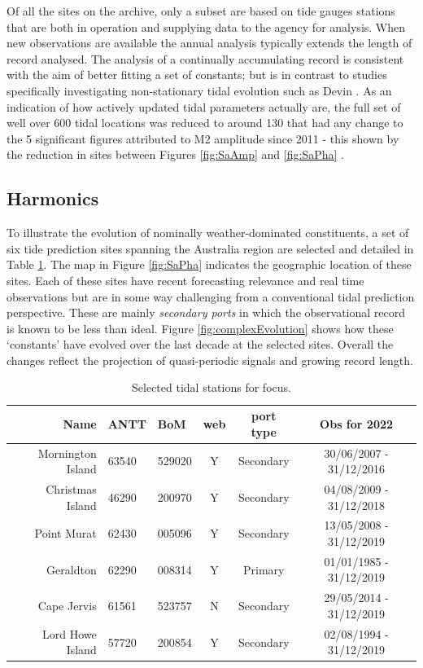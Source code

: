 Of all the sites on the archive, only a subset are based on tide gauges stations that are both in operation and supplying data to the agency for analysis. When new observations are available the annual analysis typically extends the length of record analysed.   The analysis of a continually accumulating record is consistent with the aim of better fitting a set of constants; but is in contrast to studies specifically investigating non-stationary tidal evolution such as Devin \citep{10.1002/2017jc013165}.
As an indication of how actively updated tidal parameters actually are, the full set of well over 600 tidal locations was reduced to around 130 that had any change to the 5 significant figures attributed to M2 amplitude since 2011 - this shown by the reduction in sites between Figures \ref{fig:SaAmp} and \ref{fig:SaPha} .


\subsection{Harmonics}
To illustrate the evolution of nominally weather-dominated constituents, a set of six tide prediction sites spanning the Australia region are selected and detailed in Table \ref{tab:sites}.  The map in Figure  \ref{fig:SaPha} indicates the geographic location of these sites.
Each of these sites have recent forecasting relevance and real time observations but are in some way challenging from a conventional tidal prediction perspective.   These are mainly \textit{secondary ports} in which the observational record is known to be less than ideal. 
Figure \ref{fig:complexEvolution} shows how these `constants' have evolved over the last decade at the selected sites.   Overall the changes reflect the projection of quasi-periodic signals and growing record length.  

% 
\begin{table}\centering
\begin{tabular}{ r|p{1cm}|p{1.2cm}|c|c|c }
Name 
 & ANTT 
 & BoM 
 & web  
 & port type
 & Obs for 2022
  \\ 
\hline
Mornington Island 
 & 63540 
 & 529020 
 & Y 
 & Secondary 
 & 30/06/2007 - 31/12/2016
 \\
Christmas Island  
 & 46290 
 & 200970 
 & Y 
 & Secondary 
 & 04/08/2009 - 31/12/2018
 \\
Point Murat       
 & 62430 
 & 005096 
 & Y 
 & Secondary 
 & 13/05/2008 - 31/12/2019
 \\
Geraldton         
 & 62290 
 & 008314 
 & Y
 & Primary   
 & 01/01/1985 - 31/12/2019
 \\
Cape Jervis       
 & 61561 
 & 523757 
 & N 
 & Secondary
 & 29/05/2014 - 31/12/2019
 \\
Lord Howe Island  
 & 57720 
 & 200854  
 & Y 
 & Secondary 
 & 02/08/1994 - 31/12/2019
 \\
\end{tabular}
\caption{Selected tidal stations for focus.}
\label{tab:sites}
\end{table}

